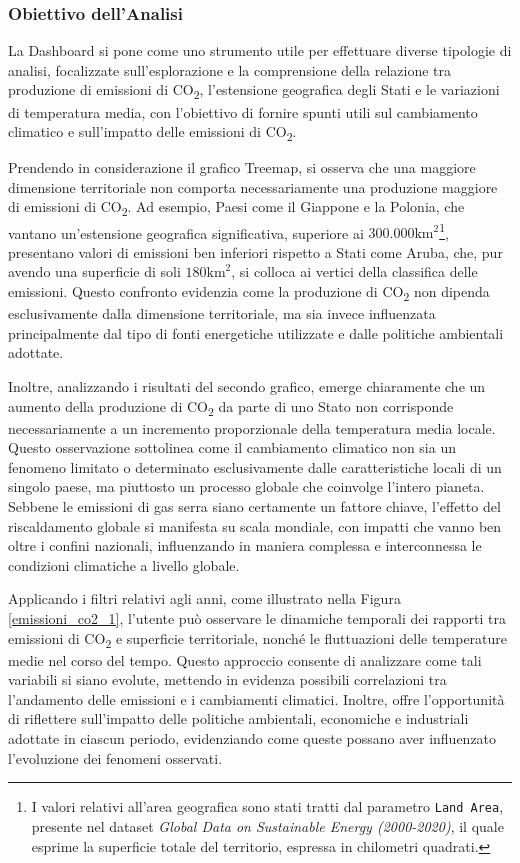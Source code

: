 \subsubsection{Obiettivo dell'Analisi}
La Dashboard si pone come uno strumento utile per effettuare diverse tipologie di analisi, focalizzate sull'esplorazione e la comprensione della relazione tra produzione di emissioni di CO\textsubscript{2}, l'estensione geografica degli Stati e le variazioni di temperatura media, con l'obiettivo di fornire spunti utili sul cambiamento climatico e sull'impatto delle emissioni di CO\textsubscript{2}.

Prendendo in considerazione il grafico Treemap, si osserva che una maggiore dimensione territoriale non comporta necessariamente una produzione maggiore di emissioni di CO\textsubscript{2}. Ad esempio, Paesi come il Giappone e la Polonia, che vantano un'estensione geografica significativa, superiore ai $300.000  \text{km}^2$\footnote{I valori relativi all'area geografica sono stati tratti dal parametro \texttt{Land Area}, presente nel dataset \textit{Global Data on Sustainable Energy (2000-2020)}, il quale esprime la superficie totale del territorio, espressa in chilometri quadrati.}, presentano valori di emissioni ben inferiori rispetto a Stati come Aruba, che, pur avendo una superficie di soli $180  \text{km}^2$, si colloca ai vertici della classifica delle emissioni. Questo confronto evidenzia come la produzione di CO\textsubscript{2} non dipenda esclusivamente dalla dimensione territoriale, ma sia invece influenzata principalmente dal tipo di fonti energetiche utilizzate e dalle politiche ambientali adottate.

Inoltre, analizzando i risultati del secondo grafico, emerge chiaramente che un aumento della produzione di CO\textsubscript{2} da parte di uno Stato non corrisponde necessariamente a un incremento proporzionale della temperatura media locale. Questo osservazione sottolinea come il cambiamento climatico non sia un fenomeno limitato o determinato esclusivamente dalle caratteristiche locali di un singolo paese, ma piuttosto un processo globale che coinvolge l'intero pianeta. Sebbene le emissioni di gas serra siano certamente un fattore chiave, l'effetto del riscaldamento globale si manifesta su scala mondiale, con impatti che vanno ben oltre i confini nazionali, influenzando in maniera complessa e interconnessa le condizioni climatiche a livello globale.

Applicando i filtri relativi agli anni, come illustrato nella Figura \ref{emissioni_co2_1}, l'utente può osservare le dinamiche temporali dei rapporti tra emissioni di CO\textsubscript{2} e superficie territoriale, nonché le fluttuazioni delle temperature medie nel corso del tempo. Questo approccio consente di analizzare come tali variabili si siano evolute, mettendo in evidenza possibili correlazioni tra l'andamento delle emissioni e i cambiamenti climatici. Inoltre, offre l'opportunità di riflettere sull'impatto delle politiche ambientali, economiche e industriali adottate in ciascun periodo, evidenziando come queste possano aver influenzato l'evoluzione dei fenomeni osservati. 

